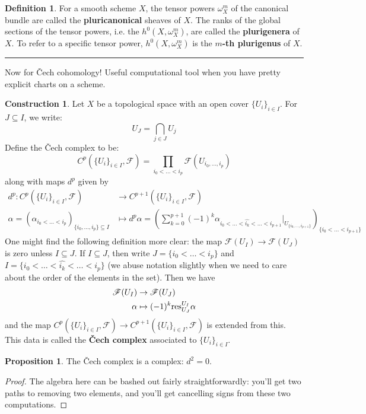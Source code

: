 \documentclass[10pt,reqno]{amsart}
\theoremstyle{definition}
\newtheorem{definition}[theorem]{Definition}
\newtheorem{proposition}[theorem]{Proposition}
\newtheorem{construction}[theorem]{Construction}
\theoremstyle{remark}
\numberwithin{equation}{section}
\numberwithin{theorem}{section}
\newcommand{\res}{\textup{res}}
\newcommand{\FF}{{\mathscr F}}
\begin{document}
\begin{definition}
For a smooth scheme $X$, the tensor powers $\omega^m_X$ of the canonical bundle are called the \textbf{pluricanonical} sheaves of $X$. The ranks of the global sections of the tensor powers, i.e. the $h^0(X,\omega_X^m)$, are called the \textbf{plurigenera} of $X$. To refer to a specific tensor power, $h^0(X,\omega_X^m)$ is the \textbf{$m$-th plurigenus} of $X$.
\end{definition}

\hrule
\vspace{1 em}

Now for \v Cech cohomology! Useful computational tool when you have pretty explicit charts on a scheme.

\begin{construction} Let $X$ be a topological space with an open cover $\{U_i\}_{i \in I}$. For $J \subseteq I$, we write:
\[U_J = \bigcap_{j \in J} U_j\]
Define the \v Cech complex to be:
\[C^p(\{U_i\}_{i \in I}, \FF) = \prod_{i_0 < \dots < i_p} \FF(U_{i_0,\dots,i_p})\]
along with maps $d^p$ given by
\begin{align*}
d^p: C^p(\{U_i\}_{i \in I}, \FF) &\to C^{p+1}(\{U_i\}_{i \in I}, \FF)\\
\alpha = (\alpha_{i_0 < \dots < i_p})_{\{i_0,\dots,i_p\} \subseteq I }& \mapsto d^p \alpha = \left(\sum_{k=0}^{p+1} (-1)^k \alpha_{i_0< \dots < \widehat{i_k} < \dots < i_{p+1}}\Big|_{U_{\{i_0,  \dots,  i_{p+1}\}}}\right)_{\{i_0 < \dots < i_{p+1}\}}
\end{align*}
One might find the following definition more clear: the map $\FF(U_I) \to \FF(U_J)$ is zero unless $I \subseteq J$. If $I \subseteq J$, then write $J = \{i_0 < \dots < i_p\}$ and $I = \{i_0 < \dots < \widehat{i_k}< \dots < i_p\}$ (we abuse notation slightly when we need to care about the order of the elements in the set). Then we have
\begin{align*}
\FF(U_I) &\to \FF(U_J)\\
\alpha &\mapsto (-1)^k \res^{U_I}_{U_J}\alpha
\end{align*}
and the map $C^p(\{U_i\}_{i \in I}, \FF) \to C^{p+1}(\{U_i\}_{i \in I}, \FF)$ is extended from this. This data is called the \textbf{\v Cech complex} associated to $\{U_i\}_{i \in I}$.
\end{construction}

\begin{proposition} The \v Cech complex is a complex: $d^2 = 0$.
\end{proposition}
\begin{proof} The algebra here can be bashed out fairly straightforwardly: you'll get two paths to removing two elements, and you'll get cancelling signs from these two computations.
\end{proof}
\end{document}
